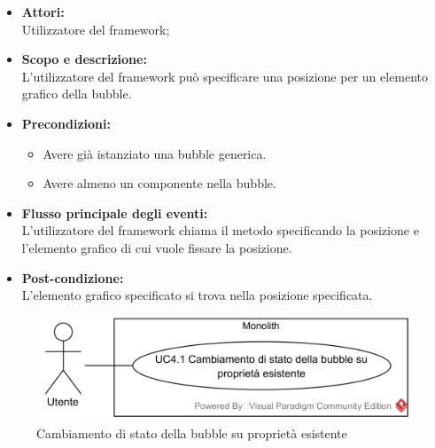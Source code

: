\begin{itemize}
	\item \textbf{Attori:}
	\\Utilizzatore del framework;
	\item \textbf{Scopo e descrizione:} 
	\\L'utilizzatore del framework può specificare una posizione per un elemento grafico della bubble.
	\item \textbf{Precondizioni:}
	\begin{itemize}
		\item Avere già istanziato una bubble generica.
		\item Avere almeno un componente nella bubble.
	\end{itemize}
	\item \textbf{Flusso principale degli eventi:}
	\\L'utilizzatore del framework chiama il metodo specificando la posizione e l'elemento grafico di cui vuole fissare la posizione.
	\item \textbf{Post-condizione:}
	\\L'elemento grafico specificato si trova nella posizione specificata.
\end{itemize}

\begin{samepage}
\isfirsttrue
{}
\nopagebreak
\begin{figure}[H]
	\centering
	\includegraphics[width=15cm]{../../documenti/AnalisiDeiRequisiti/Diagrammi_img/usecase/uc1_06.png}
	\caption{\UCCCaption{} Cambiamento di stato della bubble su proprietà esistente}
\end{figure}
\end{samepage}

